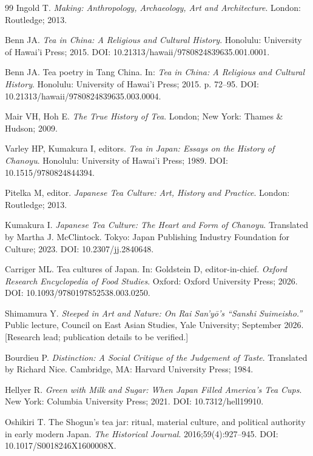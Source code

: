 \documentclass[numbers]{IntechOpen-Book}
\begin{document}
\begin{backmatter}
\begin{thebibliography}{99}
Ingold T. \textit{Making: Anthropology, Archaeology, Art and Architecture}. London: Routledge; 2013.

Benn JA. \textit{Tea in China: A Religious and Cultural History}. Honolulu: University of Hawai'i Press; 2015. DOI: 10.21313/hawaii/9780824839635.001.0001.

Benn JA. Tea poetry in Tang China. In: \textit{Tea in China: A Religious and Cultural History}. Honolulu: University of Hawai'i Press; 2015. p. 72--95. DOI: 10.21313/hawaii/9780824839635.003.0004.

Mair VH, Hoh E. \textit{The True History of Tea}. London; New York: Thames \& Hudson; 2009.

Varley HP, Kumakura I, editors. \textit{Tea in Japan: Essays on the History of Chanoyu}. Honolulu: University of Hawai'i Press; 1989. DOI: 10.1515/9780824844394.

Pitelka M, editor. \textit{Japanese Tea Culture: Art, History and Practice}. London: Routledge; 2013.

Kumakura I. \textit{Japanese Tea Culture: The Heart and Form of Chanoyu}. Translated by Martha J. McClintock. Tokyo: Japan Publishing Industry Foundation for Culture; 2023. DOI: 10.2307/jj.2840648.

Carriger ML. Tea cultures of Japan. In: Goldstein D, editor-in-chief. \textit{Oxford Research Encyclopedia of Food Studies}. Oxford: Oxford University Press; 2026. DOI: 10.1093/9780197852538.003.0250.

Shimamura Y. \textit{Steeped in Art and Nature: On Rai San'yō's ``Sanshi Suimeisho.''} Public lecture, Council on East Asian Studies, Yale University; September 2026. [Research lead; publication details to be verified.]

Bourdieu P. \textit{Distinction: A Social Critique of the Judgement of Taste}. Translated by Richard Nice. Cambridge, MA: Harvard University Press; 1984.

Hellyer R. \textit{Green with Milk and Sugar: When Japan Filled America's Tea Cups}. New York: Columbia University Press; 2021. DOI: 10.7312/hell19910.

Oshikiri T. The Shogun's tea jar: ritual, material culture, and political authority in early modern Japan. \textit{The Historical Journal}. 2016;59(4):927--945. DOI: 10.1017/S0018246X1600008X.


\end{thebibliography}
\end{backmatter}
\end{document}

